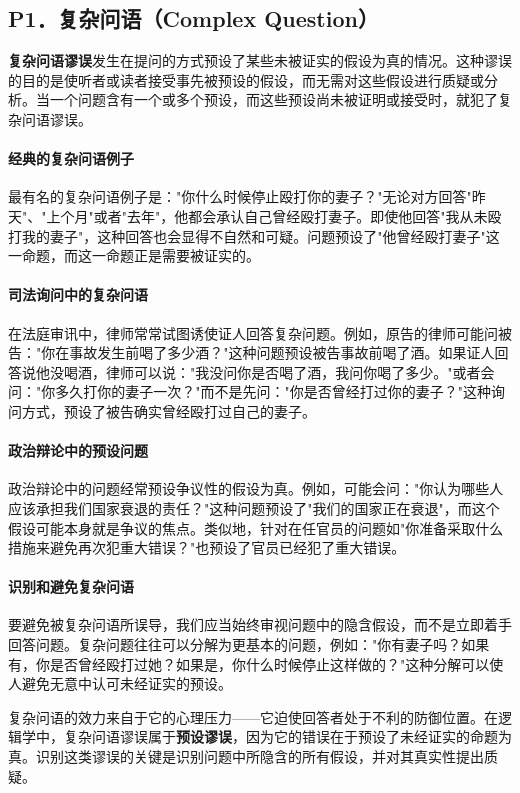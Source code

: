 \subsection{P1．复杂问语（Complex Question）}

\textbf{复杂问语谬误}发生在提问的方式预设了某些未被证实的假设为真的情况。这种谬误的目的是使听者或读者接受事先被预设的假设，而无需对这些假设进行质疑或分析。当一个问题含有一个或多个预设，而这些预设尚未被证明或接受时，就犯了复杂问语谬误。

\paragraph{经典的复杂问语例子}
最有名的复杂问语例子是："你什么时候停止殴打你的妻子？"无论对方回答"昨天"、"上个月"或者"去年"，他都会承认自己曾经殴打妻子。即使他回答"我从未殴打我的妻子"，这种回答也会显得不自然和可疑。问题预设了"他曾经殴打妻子"这一命题，而这一命题正是需要被证实的。

\paragraph{司法询问中的复杂问语}
在法庭审讯中，律师常常试图诱使证人回答复杂问题。例如，原告的律师可能问被告："你在事故发生前喝了多少酒？"这种问题预设被告事故前喝了酒。如果证人回答说他没喝酒，律师可以说："我没问你是否喝了酒，我问你喝了多少。"或者会问："你多久打你的妻子一次？"而不是先问："你是否曾经打过你的妻子？"这种询问方式，预设了被告确实曾经殴打过自己的妻子。

\paragraph{政治辩论中的预设问题}
政治辩论中的问题经常预设争议性的假设为真。例如，可能会问："你认为哪些人应该承担我们国家衰退的责任？"这种问题预设了"我们的国家正在衰退"，而这个假设可能本身就是争议的焦点。类似地，针对在任官员的问题如"你准备采取什么措施来避免再次犯重大错误？"也预设了官员已经犯了重大错误。

\paragraph{识别和避免复杂问语}
要避免被复杂问语所误导，我们应当始终审视问题中的隐含假设，而不是立即着手回答问题。复杂问题往往可以分解为更基本的问题，例如："你有妻子吗？如果有，你是否曾经殴打过她？如果是，你什么时候停止这样做的？"这种分解可以使人避免无意中认可未经证实的预设。

复杂问语的效力来自于它的心理压力——它迫使回答者处于不利的防御位置。在逻辑学中，复杂问语谬误属于\textbf{预设谬误}，因为它的错误在于预设了未经证实的命题为真。识别这类谬误的关键是识别问题中所隐含的所有假设，并对其真实性提出质疑。 